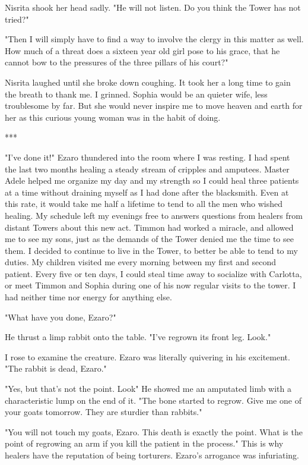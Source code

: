 \documentclass{article}
\begin{document}
Nisrita shook her head sadly. "He will not listen. Do you think the Tower has not tried?"

"Then I will simply have to find a way to involve the clergy in this matter as well. How much of a threat does a sixteen year old girl pose to his grace, that he cannot bow to the pressures of the three pillars of his court?"

Nisrita laughed until she broke down coughing. It took her a long time to gain the breath to thank me. I grinned. Sophia would be an quieter wife, less troublesome by far. But she would never inspire me to move heaven and earth for her as this curious young woman was in the habit of doing.

***

"I've done it!" Ezaro thundered into the room where I was resting. I had spent the last two months healing a steady stream of cripples and amputees. Master Adele helped me organize my day and my strength so I could heal three patients at a time without draining myself as I had done after the blacksmith. Even at this rate, it would take me half a lifetime to tend to all the men who wished healing. My schedule left my evenings free to answers questions from healers from distant Towers about this new act. Timmon had worked a miracle, and allowed me to see my sons, just as the demands of the Tower denied me the time to see them. I decided to continue to live in the Tower, to better be able to tend to my duties. My children visited me every morning between my first and second patient. Every five or ten days, I could steal time away to socialize with Carlotta, or meet Timmon and Sophia during one of his now regular visits to the tower. I had neither time nor energy for anything else. 

"What have you done, Ezaro?"

He thrust a limp rabbit onto the table. "I've regrown its front leg. Look." 

I rose to examine the creature. Ezaro was literally quivering in his excitement. "The rabbit is dead, Ezaro."

"Yes, but that's not the point. Look" He showed me an amputated limb with a characteristic lump on the end of it. "The bone started to regrow. Give me one of your goats tomorrow. They are sturdier than rabbits."

"You will not touch my goats, Ezaro. This death is exactly the point. What is the point of regrowing an arm if you kill the patient in the process." This is why healers have the reputation of being torturers. Ezaro's arrogance was infuriating. 
\end{document}
